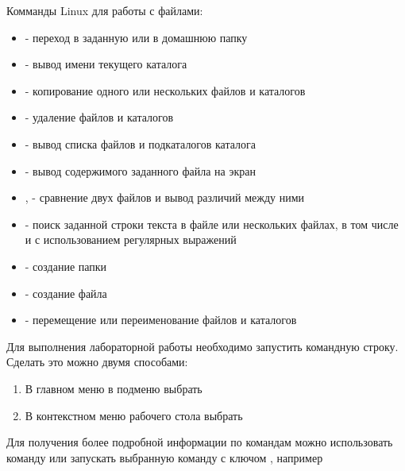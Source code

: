 \documentclass[a4paper,12pt]{article}
\begin{document}
  
  \begin{flushleft}
    Комманды Linux для работы с файлами:
    \begin{itemize}
      \item {} - переход в заданную или в домашнюю папку
      \item {} - вывод имени текущего каталога
      \item {} - копирование одного или нескольких файлов и каталогов
      \item {} - удаление файлов и каталогов
      \item {} - вывод списка файлов и подкаталогов каталога
      \item {} - вывод содержимого заданного файла на экран
      \item {},  - сравнение двух файлов и вывод различий между ними
      \item {} - поиск заданной строки текста в файле или нескольких файлах, в том числе и с использованием регулярных выражений
      \item {} - создание папки
      \item {} - создание файла
      \item {} - перемещение или переименование файлов и каталогов
    \end{itemize}
  \end{flushleft}
  
  \begin{flushleft}
    Для выполнения лабораторной работы необходимо запустить командную строку. Сделать это можно двумя способами:
    \begin{enumerate}
      \item В главном меню в подменю  выбрать 
      \item В контекстном меню рабочего стола выбрать 
    \end{enumerate}
  \end{flushleft}
  
  \begin{flushleft}
    Для получения более подробной информации по командам можно использовать команду  или запускать выбранную команду с ключом , например 
  \end{flushleft}
  
\end{document}

